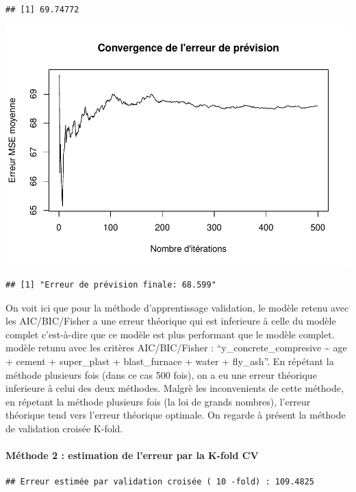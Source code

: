 \documentclass[
  12pt,
]{article}
\begin{document}
\begin{verbatim}
## [1] 69.74772
\end{verbatim}

\includegraphics{rmd_final_files/figure-latex/unnamed-chunk-50-1.pdf}

\begin{verbatim}
## [1] "Erreur de prévision finale: 68.599"
\end{verbatim}

On voit ici que pour la méthode d'apprentissage validation, le modèle
retenu avec les AIC/BIC/Fisher a une erreur théorique qui est inferieure
à celle du modèle complet c'est-à-dire que ce modèle est plus performant
que le modèle complet. modèle retunu avec les critères AIC/BIC/Fisher :
``y\_concrete\_compresive \textasciitilde{} age + cement + super\_plast
+ blast\_furnace + water + fly\_ash''. En répétant la méthode plusieurs
fois (dans ce cas 500 fois), on a eu une erreur théorique inferieure à
celui des deux méthodes. Malgrè les inconvenients de cette méthode, en
répetant la méthode plusieurs fois (la loi de grands nombres), l'erreur
théorique tend vers l'erreur théorique optimale. On regarde à présent la
méthode de validation croisée K-fold.

\paragraph{Méthode 2 : estimation de l'erreur par la K-fold
CV}\label{muxe9thode-2-estimation-de-lerreur-par-la-k-fold-cv}

\begin{verbatim}
## Erreur estimée par validation croisée ( 10 -fold) : 109.4825
\end{verbatim}
\end{document}

